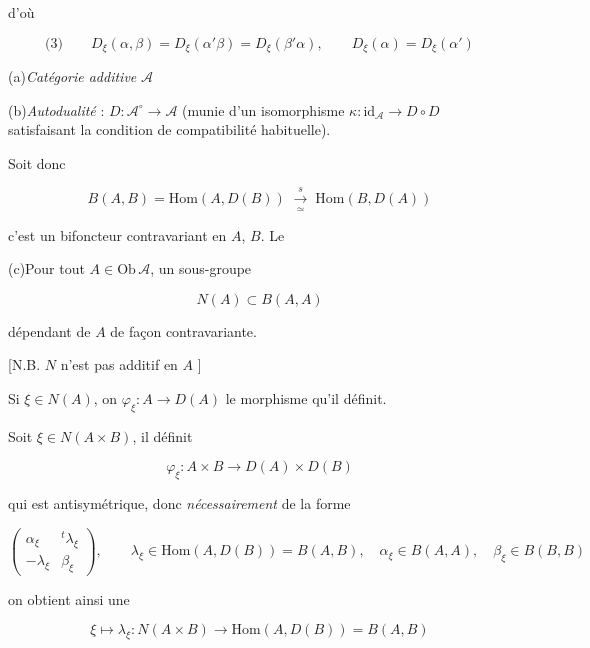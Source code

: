 \documentclass[11pt,a4paper]{article}
\begin{document}
d'où

\[
  \text{(3)}\qquad D_{\xi}(\alpha,\beta) = D_{\xi}(\alpha'\beta) =
  D_{\xi}(\beta'\alpha), \qquad D_{\xi}(\alpha) = D_{\xi}(\alpha')
\]




(a)\quad \emph{Catégorie additive} $\mathcal{A}$

(b)\quad \emph{Autodualité} : $D : \mathcal{A}^{\circ} \longrightarrow
\mathcal{A}$ (munie d'un isomorphisme $\kappa : \mathrm{id}_{\mathcal{A}}
\longrightarrow D \circ D$ satisfaisant la condition de compatibilité
habituelle).

Soit donc

\[
  B(A,B) = \mathrm{Hom}(A, D(B)) \;\xrightarrow[\ \simeq\ ]{s}\;
  \mathrm{Hom}(B, D(A))
\]

c'est un bifoncteur contravariant en $A$, $B$. Le \ill{}


(c)\quad Pour tout $A \in \mathrm{Ob}\,\mathcal{A}$, un sous-groupe

\[
  \boxed{\ N(A) \subset B(A,A)\ }
\]


dépendant de $A$ de façon \struck{\ill{}} contravariante.

[N.B. $N$ n'est pas additif en $A$ \ill{}]

Si $\xi \in N(A)$, on \ill{} $\varphi_{\xi} : A \longrightarrow D(A)$ le
morphisme qu'il définit.

Soit $\xi \in N(A\times B)$, il définit

\[
  \varphi_{\xi} : A\times B \longrightarrow D(A)\times D(B)
\]

qui est antisymétrique, donc \emph{nécessairement} de la forme

\[
  \begin{pmatrix}
    \alpha_{\xi} & {}^{t}\lambda_{\xi} \\
    -\lambda_{\xi} & \beta_{\xi}
  \end{pmatrix},
  \qquad \lambda_{\xi} \in \mathrm{Hom}(A, D(B)) = B(A,B),\quad
  \alpha_{\xi} \in B(A,A),\quad \beta_{\xi} \in B(B,B)
\]

on obtient ainsi une \ill{}

\[
  \boxed{\ \xi \longmapsto \lambda_{\xi} : N(A\times B) \longrightarrow
  \mathrm{Hom}(A, D(B)) = B(A,B)\ }
\]

\end{document}
